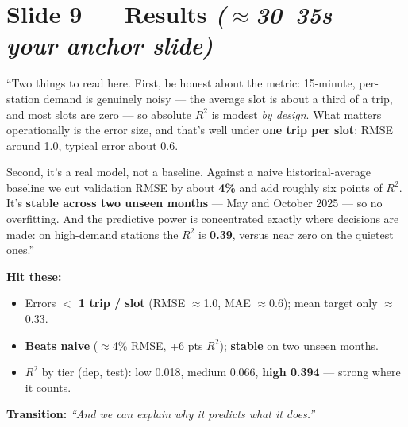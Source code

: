 \documentclass[11pt]{article}
\newcommand{\Rtwo}{$R^2$}
\newcommand{\approxx}{$\approx$}
\newcommand{\timing}[1]{\hfill{\normalsize\itshape\color{slate}(#1)}}
\newcommand{\hit}{\smallskip\noindent\textbf{\color{ink}Hit these:}}
\newcommand{\trans}[1]{\smallskip\noindent\textbf{\color{bixired}Transition:} \emph{#1}}
\begin{document}
\section{Slide 9 --- Results \timing{\approxx 30--35s --- your anchor slide}}
\begin{say}
``Two things to read here. First, be honest about the metric: 15-minute, per-station demand is genuinely
noisy --- the average slot is about a third of a trip, and most slots are zero --- so absolute \Rtwo{} is
modest \emph{by design}. What matters operationally is the error size, and that's well under \textbf{one
trip per slot}: RMSE around 1.0, typical error about 0.6.

Second, it's a real model, not a baseline. Against a naive historical-average baseline we cut validation
RMSE by about \textbf{4\%} and add roughly six points of \Rtwo. It's \textbf{stable across two unseen
months} --- May and October 2025 --- so no overfitting. And the predictive power is concentrated exactly
where decisions are made: on high-demand stations the \Rtwo{} is \textbf{0.39}, versus near zero on the
quietest ones.''
\end{say}
\hit
\begin{itemize}
  \item Errors \textbf{$<$ 1 trip / slot} (RMSE \approxx 1.0, MAE \approxx 0.6); mean target only \approxx 0.33.
  \item \textbf{Beats naive} (\approxx 4\% RMSE, +6 pts \Rtwo); \textbf{stable} on two unseen months.
  \item \Rtwo{} by tier (dep, test): low 0.018, medium 0.066, \textbf{high 0.394} --- strong where it counts.
\end{itemize}
\trans{``And we can explain \emph{why} it predicts what it does.''}

\end{document}

